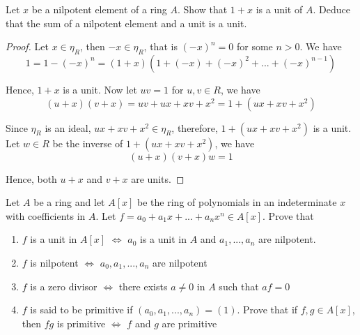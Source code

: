
\begin{problem}
	Let $x$ be a nilpotent element of a ring $A$. Show that $1 + x$ is a unit of $A$. Deduce that the sum of a nilpotent element and a unit is a unit.
\end{problem}

\begin{proof}
	Let $x \in \eta_R$, then $-x \in \eta_R$, that is $(-x)^n = 0$ for some $n > 0$. We have
	$$
		1 = 1 - (-x)^n = (1 + x)(1 + (-x) + (-x)^2 + ... + (-x)^{n-1})
	$$
	
	Hence, $1 + x$ is a unit. Now let $uv = 1$ for $u, v \in R$, we have
	$$
		(u + x)(v + x) = uv + ux + xv + x^2 = 1 + (ux + xv + x^2)
	$$
	
	Since $\eta_R$ is an ideal, $ux + xv + x^2 \in \eta_R$, therefore, $1 + (ux + xv + x^2)$ is a unit. Let $w \in R$ be the inverse of $1 + (ux + xv + x^2)$, we have
	$$
		(u + x)(v + x) w = 1
	$$
	
	Hence, both $u + x$ and $v + x$ are units.
\end{proof}

\begin{problem}
	Let $A$ be a ring and let $A[x]$ be the ring of polynomials in an indeterminate $x$ with coefficients in $A$. Let $f = a_0 + a_1 x + ... + a_n x^n \in A[x]$. Prove that
	\begin{enumerate}
		\item $f$ is a unit in $A[x]$ $\iff$ $a_0$ is a unit in $A$ and $a_1, ..., a_n$ are nilpotent.
		\item $f$ is nilpotent $\iff$ $a_0, a_1, ..., a_n$ are nilpotent
		\item $f$ is a zero divisor $\iff$ there exists $a \neq 0$ in $A$ such that $af = 0$
		\item $f$ is said to be primitive if $(a_0, a_1, ..., a_n) = (1)$. Prove that if $f, g \in A[x]$, then $fg$ is primitive $\iff$ $f$ and $g$ are primitive
	\end{enumerate}
\end{problem}

